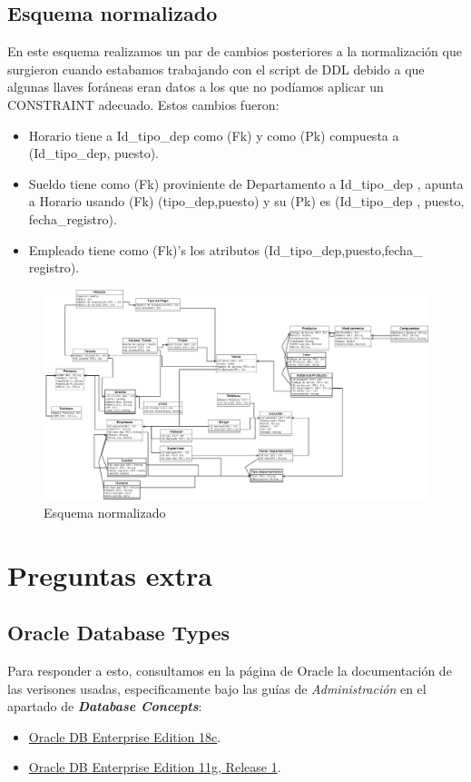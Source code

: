 \documentclass[10pt]{article}
\begin{document}
	\subsection{Esquema normalizado}
	En este esquema realizamos un par de cambios posteriores a la normalización 
	que surgieron cuando estabamos trabajando con el script de DDL debido a que
	algunas llaves foráneas eran datos a los que no podíamos aplicar un CONSTRAINT
	adecuado. Estos cambios fueron:
	\begin{itemize}
	    \item Horario tiene a Id\_tipo\_dep como (Fk) y como (Pk) compuesta a 
	    (Id\_tipo\_dep, puesto).
	    \item Sueldo tiene como (Fk) proviniente de Departamento a Id\_tipo\_dep
	    , apunta a Horario usando (Fk) (tipo\_dep,puesto) y su (Pk) es (Id\_tipo\_dep
	    , puesto, fecha\_registro).
	    \item Empleado tiene como (Fk)'s los atributos (Id\_tipo\_dep,puesto,fecha\_
	    registro).
	\end{itemize}
	
	\begin{figure}[H]
		\centering
		\includegraphics[scale=0.2]{practica07Norm.jpeg}
		\caption{Esquema normalizado}
		\label{fg:en}
	\end{figure}
	
	\section*{Preguntas extra}
	
	\subsection*{Oracle Database Types}
	Para  responder a esto, consultamos en la página de Oracle la documentación
	de las verisones usadas, especificamente bajo las guías de \textit{Administración}
	en el apartado de \textit{\textbf{Database Concepts}}:
	    \begin{itemize}
	        \item \href{https://docs.oracle.com/en/database/oracle/oracle-database/18/cncpt/database-concepts.pdf}
	        {Oracle DB Enterprise Edition 18c}.
	        \item \href{https://docs.oracle.com/cd/B28359_01/server.111/b28318/datatype.htm#CNCPT413}
	        {Oracle DB Enterprise Edition 11g, Release 1}.
	    \end{itemize}
\end{document}
